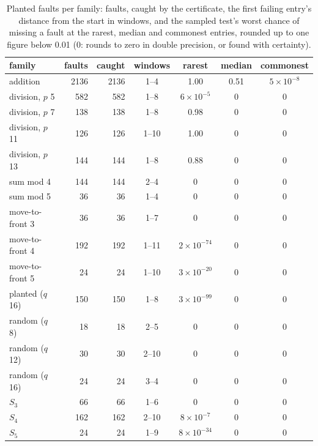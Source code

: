 \documentclass[11pt]{article}
\theoremstyle{definition}
\begin{document}
\begin{table}[t]
\centering
\caption{Planted faults per family: faults, caught by the certificate, the first failing entry's
distance from the start in windows, and the sampled test's worst chance of missing a fault at the
rarest, median and commonest entries, rounded up to one figure below 0.01 ($0$: rounds to zero in
double precision, or found with certainty).}
\label{tab:faults}
\begin{tabular}{lrrcccc}
\toprule
family & faults & caught & windows & rarest & median & commonest \\
\midrule
addition & 2136 & 2136 & 1--4 & 1.00 & 0.51 & $5 \times 10^{-8}$ \\
division, $p$ 5 & 582 & 582 & 1--8 & $6 \times 10^{-5}$ & $0$ & $0$ \\
division, $p$ 7 & 138 & 138 & 1--8 & 0.98 & $0$ & $0$ \\
division, $p$ 11 & 126 & 126 & 1--10 & 1.00 & $0$ & $0$ \\
division, $p$ 13 & 144 & 144 & 1--8 & 0.88 & $0$ & $0$ \\
sum mod 4 & 144 & 144 & 2--4 & $0$ & $0$ & $0$ \\
sum mod 5 & 36 & 36 & 1--4 & $0$ & $0$ & $0$ \\
move-to-front 3 & 36 & 36 & 1--7 & $0$ & $0$ & $0$ \\
move-to-front 4 & 192 & 192 & 1--11 & $2 \times 10^{-74}$ & $0$ & $0$ \\
move-to-front 5 & 24 & 24 & 1--10 & $3 \times 10^{-20}$ & $0$ & $0$ \\
planted ($q$ 16) & 150 & 150 & 1--8 & $3 \times 10^{-99}$ & $0$ & $0$ \\
random ($q$ 8) & 18 & 18 & 2--5 & $0$ & $0$ & $0$ \\
random ($q$ 12) & 30 & 30 & 2--10 & $0$ & $0$ & $0$ \\
random ($q$ 16) & 24 & 24 & 3--4 & $0$ & $0$ & $0$ \\
$S_3$ & 66 & 66 & 1--6 & $0$ & $0$ & $0$ \\
$S_4$ & 162 & 162 & 2--10 & $8 \times 10^{-7}$ & $0$ & $0$ \\
$S_5$ & 24 & 24 & 1--9 & $8 \times 10^{-34}$ & $0$ & $0$ \\
\bottomrule
\end{tabular}
\end{table}
\end{document}
